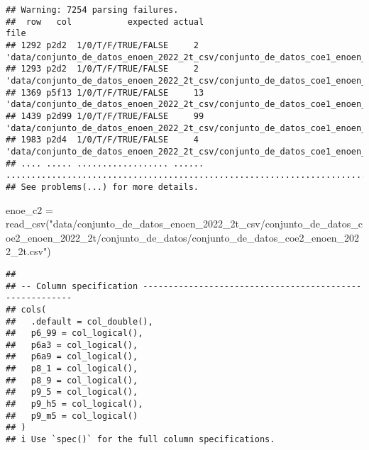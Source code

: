 \documentclass[
]{article}
\newenvironment{Shaded}{\begin{snugshade}}{\end{snugshade}}
\newcommand{\FunctionTok}[1]{\textcolor[rgb]{0.00,0.00,0.00}{#1}}
\newcommand{\NormalTok}[1]{#1}
\newcommand{\OtherTok}[1]{\textcolor[rgb]{0.56,0.35,0.01}{#1}}
\newcommand{\StringTok}[1]{\textcolor[rgb]{0.31,0.60,0.02}{#1}}
\begin{document}
\begin{verbatim}
## Warning: 7254 parsing failures.
##  row   col           expected actual                                                                                                                                       file
## 1292 p2d2  1/0/T/F/TRUE/FALSE     2  'data/conjunto_de_datos_enoen_2022_2t_csv/conjunto_de_datos_coe1_enoen_2022_2t/conjunto_de_datos/conjunto_de_datos_coe1_enoen_2022_2t.csv'
## 1293 p2d2  1/0/T/F/TRUE/FALSE     2  'data/conjunto_de_datos_enoen_2022_2t_csv/conjunto_de_datos_coe1_enoen_2022_2t/conjunto_de_datos/conjunto_de_datos_coe1_enoen_2022_2t.csv'
## 1369 p5f13 1/0/T/F/TRUE/FALSE     13 'data/conjunto_de_datos_enoen_2022_2t_csv/conjunto_de_datos_coe1_enoen_2022_2t/conjunto_de_datos/conjunto_de_datos_coe1_enoen_2022_2t.csv'
## 1439 p2d99 1/0/T/F/TRUE/FALSE     99 'data/conjunto_de_datos_enoen_2022_2t_csv/conjunto_de_datos_coe1_enoen_2022_2t/conjunto_de_datos/conjunto_de_datos_coe1_enoen_2022_2t.csv'
## 1983 p2d4  1/0/T/F/TRUE/FALSE     4  'data/conjunto_de_datos_enoen_2022_2t_csv/conjunto_de_datos_coe1_enoen_2022_2t/conjunto_de_datos/conjunto_de_datos_coe1_enoen_2022_2t.csv'
## .... ..... .................. ...... ..........................................................................................................................................
## See problems(...) for more details.
\end{verbatim}

\begin{Shaded}
\begin{Highlighting}[]
\NormalTok{enoe\_c2 }\OtherTok{=} \FunctionTok{read\_csv}\NormalTok{(}\StringTok{"data/conjunto\_de\_datos\_enoen\_2022\_2t\_csv/conjunto\_de\_datos\_coe2\_enoen\_2022\_2t/conjunto\_de\_datos/conjunto\_de\_datos\_coe2\_enoen\_2022\_2t.csv"}\NormalTok{)}
\end{Highlighting}
\end{Shaded}

\begin{verbatim}
## 
## -- Column specification --------------------------------------------------------
## cols(
##   .default = col_double(),
##   p6_99 = col_logical(),
##   p6a3 = col_logical(),
##   p6a9 = col_logical(),
##   p8_1 = col_logical(),
##   p8_9 = col_logical(),
##   p9_5 = col_logical(),
##   p9_h5 = col_logical(),
##   p9_m5 = col_logical()
## )
## i Use `spec()` for the full column specifications.
\end{verbatim}
\end{document}

